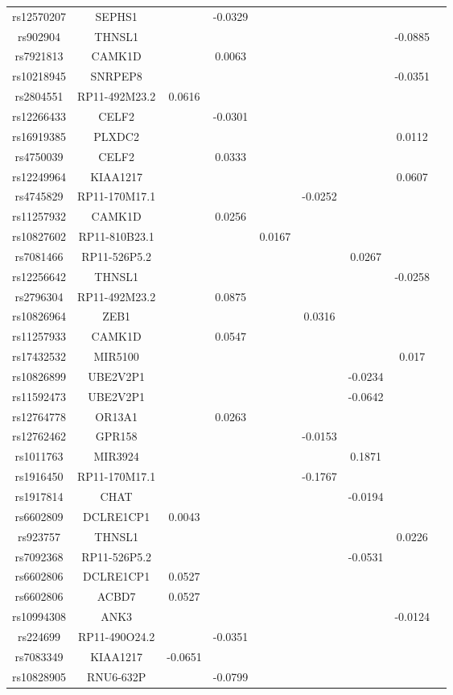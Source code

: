 \documentclass[12pt]{article}
\begin{document}
\begin{longtable}{ c c c c c c c c c}
rs12570207&SEPHS1&  & -0.0329 & & &  &  \\
rs902904&THNSL1&  &  & & &  &-0.0885  \\
rs7921813&CAMK1D&  &0.0063  & & &  &  \\
rs10218945&SNRPEP8&  & & & &  &-0.0351  \\
rs2804551&RP11-492M23.2&0.0616  & & & &  &  \\
rs12266433&CELF2& &-0.0301 & & &  &  \\
rs16919385&PLXDC2& & & & &  &0.0112  \\
rs4750039&CELF2& &0.0333 & & &  &\\
rs12249964&KIAA1217& &  & & &  &0.0607 \\
rs4745829&RP11-170M17.1 &  & & &-0.0252  & \\
rs11257932&CAMK1D &  &0.0256 & & & \\
rs10827602&RP11-810B23.1 &  &  &0.0167 & & \\
rs7081466&RP11-526P5.2&  & &  & & 0.0267& \\
rs12256642&THNSL1&  &  & & & &-0.0258 \\
rs2796304&RP11-492M23.2&  &0.0875  & & &  \\
rs10826964&ZEB1&  & & &0.0316 & & \\
rs11257933&CAMK1D&  &0.0547 & &  & & \\
rs17432532&MIR5100&  &  & &  & &0.017 \\
rs10826899&UBE2V2P1&  &  & &  &-0.0234 & \\
rs11592473&UBE2V2P1&  &  & &  &-0.0642& \\
rs12764778&OR13A1&  &0.0263  & &  & & \\
rs12762462&GPR158&  &   & & -0.0153 & & \\
rs1011763&MIR3924&  &   & &  &0.1871 & \\
rs1916450&RP11-170M17.1&  &   & &-0.1767  &  & \\
rs1917814&CHAT&  &   &  &   & -0.0194 & \\
rs6602809&DCLRE1CP1&0.0043  &   &  &   &   & \\
rs923757&THNSL1&   &   &  &   &   &0.0226 \\
rs7092368&RP11-526P5.2&   &   &  &   & -0.0531  & \\
rs6602806&DCLRE1CP1&0.0527   &   &  &   &    & \\
rs6602806&ACBD7&0.0527   &   &  &   &    & \\
rs10994308&ANK3&   &   &  &   &    &-0.0124 \\
rs224699&RP11-490O24.2&   &-0.0351   &  &   &    &  \\
rs7083349&KIAA1217&-0.0651   &    &  &   &    &  \\
rs10828905&RNU6-632P&    &-0.0799    &  &   &    &  \\


\end{longtable} 
\end{document}
